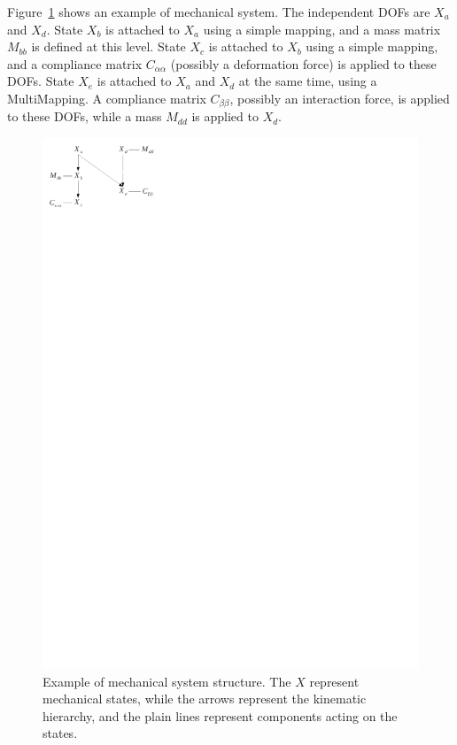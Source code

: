 Figure~\ref{fig system graph} shows an example of mechanical system.
The independent DOFs are $X_{a}$ and $X_d$.
State $X_b$ is attached to $X_a$ using a simple mapping, and a mass matrix $M_{bb}$ is defined at this level.
State $X_c$ is attached to $X_b$ using a simple mapping, and a compliance matrix $C_{\alpha \alpha}$ (possibly a deformation force) is applied to these DOFs.
State $X_e$ is attached to $X_a$ and  $X_d$ at the same time, using a MultiMapping. A compliance matrix $C_{\beta \beta}$, possibly an interaction force, is applied to these DOFs, 
while a mass $M_{dd}$ is applied to $X_d$.
\begin{figure}
\centering
\includegraphics[clip,trim= 0mm 255mm 145mm 0mm,width=0.49\linewidth]{system-graph.pdf}
\caption{Example of mechanical system structure. The $X$ represent mechanical states, while the arrows represent the kinematic hierarchy, and the plain lines represent components acting on the states.}
\label{fig system graph}
\end{figure}


